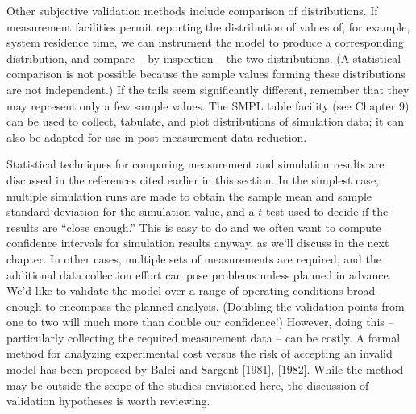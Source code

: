 Other subjective validation methods include comparison of distributions. If
measurement facilities permit reporting the distribution of values of, for
example, system residence time, we can instrument the model to produce a
corresponding distribution, and compare -- by inspection -- the two
distributions. (A statistical comparison is not possible because the sample
values forming these distributions are not independent.) If the tails seem
significantly different, remember that they may represent only a few sample
values. The SMPL table facility (see Chapter 9) can be used to collect,
tabulate, and plot distributions of simulation data; it can also be adapted for
use in post-measurement data reduction.

Statistical techniques for comparing measurement and simulation results are
discussed in the references cited earlier in this section. In the simplest
case, multiple simulation runs are made to obtain the sample mean and sample
standard deviation for the simulation value, and a $t$ test used to decide if
the results are ``close enough.'' This is easy to do and we often want to
compute confidence intervals for simulation results anyway, as we'll discuss in
 the next chapter. In other cases, multiple sets of measurements are required,
and the additional data collection effort can pose problems unless planned in
advance.
We'd like to validate the model over a range of operating conditions broad
enough to encompass the planned analysis. (Doubling the validation points from
one to two will much more than double our confidence!) However, doing this --
particularly collecting the required measurement data -- can be costly. A
formal method for analyzing experimental cost versus the risk of accepting an
invalid model has been proposed by Balci and Sargent [1981], [1982]. While the
method may be outside the scope of the studies envisioned here, the discussion
of validation hypotheses is worth reviewing.

